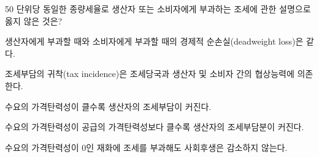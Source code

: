 \begin{question}{50}
단위당 동일한 종량세율로 생산자 또는 소비자에게 부과하는 조세에 관한 설명으로 옳지 않은 것은?
\begin{choices}
  \item 생산자에게 부과할 때와 소비자에게 부과할 때의 경제적 순손실(deadweight loss)은 같다.
  \item 조세부담의 귀착(tax incidence)은 조세당국과 생산자 및 소비자 간의 협상능력에 의존한다.
  \item 수요의 가격탄력성이 클수록 생산자의 조세부담이 커진다.
  \item 수요의 가격탄력성이 공급의 가격탄력성보다 클수록 생산자의 조세부담분이 커진다.
  \item 수요의 가격탄력성이 0인 재화에 조세를 부과해도 사회후생은 감소하지 않는다.
\end{choices}
\end{question}
